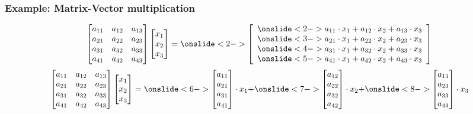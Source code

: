 \begin{frame}
  \frametitle{Example: Matrix-Vector multiplication}
  \[
  \begin{bmatrix}
    a_{11} & a_{12} & a_{13} \\
    a_{21} & a_{22} & a_{23} \\
    a_{31} & a_{32} & a_{33} \\
    a_{41} & a_{42} & a_{43}
  \end{bmatrix}
  \begin{bmatrix}
    x_1 \\
    x_2 \\
    x_3 
  \end{bmatrix}
  =
  \onslide<2->{
    \left[
      \begin{array}{c}
        \onslide<2->{a_{11}\cdot x_1 + a_{12}\cdot x_2 + a_{13}\cdot x_3} \\
        \onslide<3->{a_{21}\cdot x_1 + a_{22}\cdot x_2 + a_{23}\cdot x_3} \\
        \onslide<4->{a_{31}\cdot x_1 + a_{32}\cdot x_2 + a_{33}\cdot x_3} \\
        \onslide<5->{a_{41}\cdot x_1 + a_{42}\cdot x_2 + a_{43}\cdot x_3} 
      \end{array}
      \right]
  }
  \]
  \[
  \begin{bmatrix}
    a_{11} & a_{12} & a_{13} \\
    a_{21} & a_{22} & a_{23} \\
    a_{31} & a_{32} & a_{33} \\
    a_{41} & a_{42} & a_{43}
  \end{bmatrix}
  \begin{bmatrix}
    x_1 \\
    x_2 \\
    x_3 
  \end{bmatrix}
  =
  \onslide<6->{
  \begin{bmatrix}
    a_{11} \\
    a_{21} \\
    a_{31} \\
    a_{41}
  \end{bmatrix}
  \cdot x_1
  +
  }
  \onslide<7->{
  \begin{bmatrix}
    a_{12} \\
    a_{22} \\
    a_{32} \\
    a_{42}
  \end{bmatrix}
  \cdot x_2
  +
  }
  \onslide<8->{
  \begin{bmatrix}
    a_{13} \\
    a_{23} \\
    a_{33} \\
    a_{43}
  \end{bmatrix}
  \cdot x_3
  }
  \]
\end{frame}


